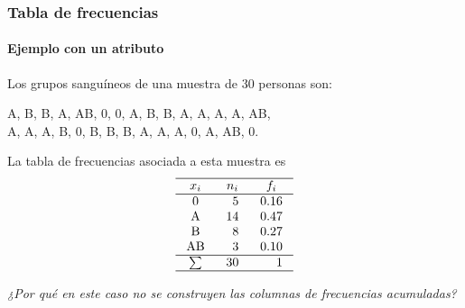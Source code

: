 \begin{frame}
\frametitle{Tabla de frecuencias}
\framesubtitle{Ejemplo con un atributo}
Los grupos sanguíneos de una muestra de 30 personas son:
\begin{center}
A, B, B, A, AB, 0, 0, A, B, B, A, A, A, A, AB,\\
A, A, A, B, 0, B, B, B, A, A, A, 0, A, AB, 0. 
\end{center}
La tabla de frecuencias asociada a esta muestra es
\[
\setlength\arraycolsep{3mm}
\setlength\arrayrulewidth{0.5pt}
\begin{array}{crr}
\hline
\multicolumn{1}{c}{x_i} & \multicolumn{1}{c}{n_i} & \multicolumn{1}{c}{f_i} \\
\hline
\mbox{0} & 5 & 0.16 \\
\mbox{A} & 14 & 0.47 \\
\mbox{B} & 8 & 0.27 \\
\mbox{AB} & 3 & 0.10 \\
\hline 
\sum & 30 & 1 \\
\hline
\end{array}
\]
\begin{center}
\emph{¿Por qué en este caso no se construyen las columnas de frecuencias acumuladas?}
\end{center}
\end{frame}


